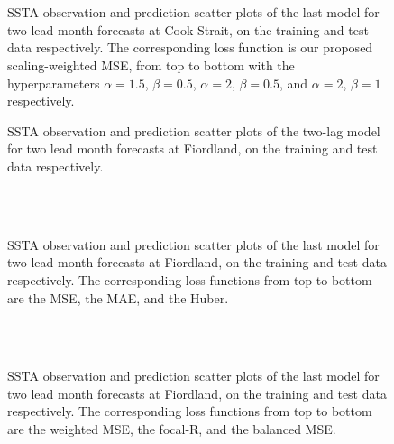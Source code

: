 \documentclass[11pt, a4paper]{article}
\begin{document}
\begin{figure}[H]
\centering
{}
\\
\\
\caption{SSTA observation and prediction scatter plots of the last model for two lead month forecasts at Cook Strait, on the training and test data respectively. The corresponding loss function is our proposed scaling-weighted MSE, from top to bottom with the hyperparameters $\alpha=1.5$, $\beta=0.5$, $\alpha=2$, $\beta=0.5$, and $\alpha=2$, $\beta=1$ respectively.}
\end{figure}

\begin{figure}[H]
\centering
{}
\caption{SSTA observation and prediction scatter plots of the two-lag model for two lead month forecasts at Fiordland, on the training and test data respectively.}
\end{figure}

\begin{figure}[H]
\centering
{}
\\
\\
\caption{SSTA observation and prediction scatter plots of the last model for two lead month forecasts at Fiordland, on the training and test data respectively. The corresponding loss functions from top to bottom are the MSE, the MAE, and the Huber.}
\end{figure}

\begin{figure}[H]
\centering
{}
\\
\\
\caption{SSTA observation and prediction scatter plots of the last model for two lead month forecasts at Fiordland, on the training and test data respectively. The corresponding loss functions from top to bottom are the weighted MSE, the focal-R, and the balanced MSE.}
\end{figure}
\end{document}
